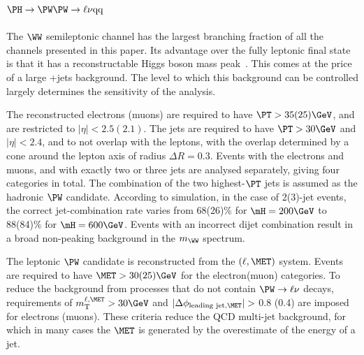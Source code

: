 \subsection{$\PH \to \PW\PW \to \ell\nu \rm{qq}$}

The $\WW$ semileptonic channel has the largest branching fraction of all the channels presented in this paper.
Its advantage over the fully leptonic final state is that it has a reconstructable Higgs boson mass peak~\cite{intro2}. This
comes at the price of a large \PW+jets background. The level to which this background can be controlled
largely determines the sensitivity of the analysis. 

The reconstructed electrons (muons) are required to have 
$\PT>35(25)\GeV$, and are restricted to $|\eta|<2.5(2.1)$.
The jets are required to have 
$\PT>30\GeV$ and $|\eta|<2.4$, and to not
overlap with the leptons, 
with the overlap determined by a cone around the lepton axis of radius $\Delta R = 0.3$. 
Events with the electrons and muons, and with exactly two or three jets are analysed separately,
giving four categories in total.
The combination of the two highest-$\PT$ jets is assumed as the hadronic $\PW$ candidate. According to simulation, in the case of 2(3)-jet events, the correct jet-combination rate varies from 68(26)\% for $\mH = 200\GeV$ to 88(84)\% for
$\mH = 600\GeV$. Events with an incorrect dijet combination result in a broad non-peaking background in the $m_{\WW}$ spectrum.

The leptonic $\PW$ candidate is reconstructed from the $(\ell,\MET)$ system. Events are required to have $\MET>\text{30(25)}\GeV$ for the electron(muon) categories. To reduce the background from processes that do not
contain $\PW\to\ell\nu$ decays, requirements of $m_{\rm{T}}^{\ell,\MET}>30\GeV$ and
$|\Delta\phi_{\textrm{leading jet,\MET}}| >$ 0.8 (0.4) are imposed for electrons (muons). These criteria reduce the QCD multi-jet background, for which in many cases the $\MET$ is generated by the overestimate of the energy of a jet.

